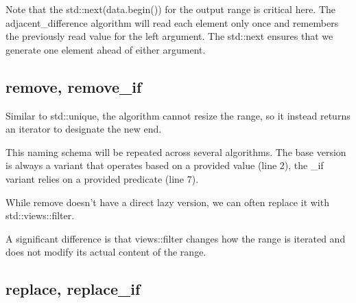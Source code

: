 Note that the std::next(data.begin()) for the output range is critical here. The adjacent\_difference algorithm will read each element only once and remembers the previously read value for the left argument. The std::next ensures that we generate one element ahead of either argument.

\subsection{remove, remove\_if}



Similar to std::unique, the algorithm cannot resize the range, so it instead returns an iterator to designate the new end.

\begin{box-note}
\end{box-note}

This naming schema will be repeated across several algorithms. The base version is always a variant that operates based on a provided value (line 2), the \_if variant relies on a provided predicate (line 7).

While remove doesn’t have a direct lazy version, we can often replace it with std::views::filter.

\begin{box-note}
\end{box-note}

A significant difference is that views::filter changes how the range is iterated and does not modify its actual content of the range.

\subsection{replace, replace\_if}

